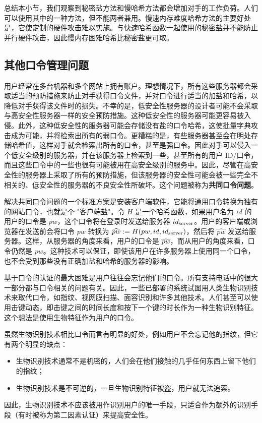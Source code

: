 \begin{snote}[慢哈希与秘密盐.]
总结本小节，我们观察到秘密盐方法和慢哈希方法都会增加对手的工作负荷。人们可以使用其中的一种方法，但不能两者兼用。慢速内存难度哈希方法的主要好处是，它使定制的硬件攻击难以实施。与快速哈希函数一起使用的秘密盐并不能防止并行硬件攻击，因此慢内存困难哈希比秘密盐更可取。
\end{snote}

\subsection{其他口令管理问题}

\begin{snote}
用户经常在多台机器和多个网站上拥有账户。理想情况下，所有这些服务器都会采取适当的预防措施来防止对手获得口令文件，并对口令进行适当的加盐和哈希，以降低对手获得该文件时的损失。不幸的是，低安全性服务器的设计者可能不会采取与高安全性服务器一样的安全预防措施。这种低安全性的服务器可能更容易被入侵。此外，这种低安全性的服务器可能会存储没有盐的口令哈希，这使批量字典攻击成为可能，并将检索出所有的弱口令。更糟糕的是，有些服务器甚至会在明处存储哈希值，这样对手就会检索出所有的口令，甚至是强口令。因此对手可以侵入一个低安全级别的服务器，并在该服务器上检索到一些，甚至所有的用户 ID/口令，而且这些口令中的一些也很有可能被用在高安全级别的服务中。因此，尽管在高安全性的服务器上采取了所有的预防措施，但该服务器的安全性可能会被一些完全不相关的、低安全性的服务器的不良安全性所破坏。这个问题被称为\textbf{共同口令问题}。

解决共同口令问题的一个标准方案是安装客户端软件，它能将通用口令转换为独有的网站口令，也就是个 "客户端盐"。令 $H$ 是一个哈希函数，如果用户名为 $id$ 的用户的口令是 $pw$，这个口令将在登录时发送给服务器 $id_{\rm server}$。用户的客户端或浏览器在发送前会将口令 $pw$ 转换为 $\widehat{pw}:=H(pw,id,id_{\rm server})$，然后将 $\widehat{pw}$ 发送给服务器。这样，从服务器的角度来看，用户的口令是 $\widehat{pw}$，而从用户的角度来看，口令仍然是 $pw$。这种技术可以保证，即使该用户在许多服务器上使用同一个口令，也不会受到那些没有正确加盐和哈希的服务器的影响。
\end{snote}

\begin{snote}
基于口令的认证的最大困难是用户往往会忘记他们的口令。所有支持电话中的很大一部分都与口令相关的问题有关。因此，一些已部署的系统试图用人类生物识别技术来取代口令，如指纹、视网膜扫描、面容识别和许多其他技术。人们甚至可以使用击键动态，即击键之间的时间长度和按下一个键的时长作为一种生物识别特征。这个想法是使用生物特征作为用户的口令。

虽然生物识别技术相比口令而言有明显的好处，例如用户不会忘记他的指纹，但它有两个明显的缺点：
\begin{itemize}
	\item 生物识别技术通常不是机密的，人们会在他们接触的几乎任何东西上留下他们的指纹；
	\item 生物识别技术是不可逆的，一旦生物识别特征被盗，用户就无法追索。
\end{itemize}
因此，生物识别技术不应该被用作识别用户的唯一手段，只适合作为额外的识别手段（有时被称为第二因素认证）来提高安全性。
\end{snote}